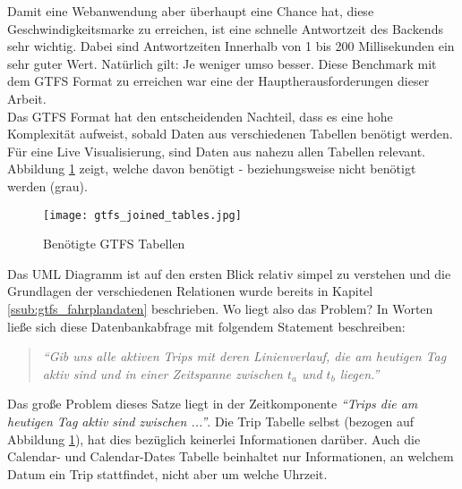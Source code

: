     Damit eine Webanwendung aber überhaupt eine Chance hat, diese Geschwindigkeitsmarke zu erreichen, ist eine schnelle Antwortzeit des Backends sehr wichtig. Dabei sind Antwortzeiten Innerhalb von 1 bis 200 Millisekunden ein sehr guter Wert. Natürlich gilt: Je weniger umso besser. Diese Benchmark mit dem GTFS Format zu erreichen war eine der Hauptherausforderungen dieser Arbeit.\\

    Das GTFS Format hat den entscheidenden Nachteil, dass es eine hohe Komplexität aufweist, sobald Daten aus verschiedenen Tabellen benötigt werden. Für eine Live Visualisierung, sind Daten aus nahezu allen Tabellen relevant. Abbildung \ref{fig:gtfs_joined_tables} zeigt, welche davon benötigt - beziehungsweise nicht benötigt werden (grau).

    \begin{figure}[ht]
      \begin{center}
        \texttt{[image: gtfs\_joined\_tables.jpg]}
        \caption{Benötigte GTFS Tabellen\parencite{google_gtfs_reference}}
        \label{fig:gtfs_joined_tables}
      \end{center}
    \end{figure}

    Das UML Diagramm ist auf den ersten Blick relativ simpel zu verstehen und die Grundlagen der verschiedenen Relationen wurde bereits in Kapitel \ref{ssub:gtfs_fahrplandaten} beschrieben. Wo liegt also das Problem? In Worten ließe sich diese Datenbankabfrage mit folgendem Statement beschreiben: 

    \begin{quote}
      \label{query_statement}
      \textit{"`Gib uns alle aktiven Trips mit deren Linienverlauf, die am heutigen Tag aktiv sind und in einer Zeitspanne zwischen $t_a$ und $t_b$ liegen."'}
    \end{quote}

    Das große Problem dieses Satze liegt in der Zeitkomponente \textit{"`Trips die am heutigen Tag aktiv sind zwischen ..."'}. Die Trip Tabelle selbst (bezogen auf Abbildung \ref{fig:gtfs_joined_tables}), hat dies bezüglich keinerlei Informationen darüber. Auch die Calendar- und Calendar-Dates Tabelle beinhaltet nur Informationen, an welchem Datum ein Trip stattfindet, nicht aber um welche Uhrzeit. 

